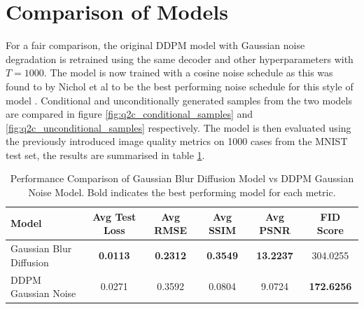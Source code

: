\documentclass[11pt]{article}
\begin{document}
\section{Comparison of Models}
For a fair comparison, the original DDPM model with Gaussian noise degradation is retrained using the same decoder and other hyperparameters with $T=1000$. The model is now trained with a cosine noise schedule as this was found to by Nichol et al to be the best performing noise schedule for this style of model \cite{nichol2021improved}. Conditional and unconditionally generated samples from the two models are compared in figure \ref{fig:q2c_conditional_samples} and \ref{fig:q2c_unconditional_samples} respectively. The model is then evaluated using the previously introduced image quality metrics on 1000 cases from the MNIST test set, the results are summarised in table \ref{tab:q2c_model_comparison}.
\begin{table}[h]
    \centering
    \begin{tabular}{lccccc}
    \hline
    Model & Avg Test Loss & Avg RMSE & Avg SSIM & Avg PSNR & FID Score \\
    \hline
    Gaussian Blur Diffusion & \textbf{0.0113} & \textbf{0.2312} & \textbf{0.3549} & \textbf{13.2237} & 304.0255 \\
    DDPM Gaussian Noise & 0.0271 & 0.3592 & 0.0804 & 9.0724 & \textbf{172.6256} \\
    \hline
    \end{tabular}
    \caption{Performance Comparison of Gaussian Blur Diffusion Model vs DDPM Gaussian Noise Model. Bold indicates the best performing model for each metric.}
    \label{tab:q2c_model_comparison}
\end{table}
\end{document}
